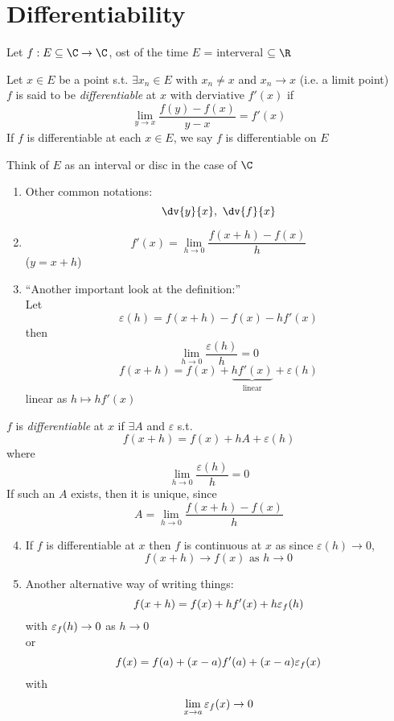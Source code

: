 \section{Differentiability}
\begin{normal}
Let $f:E\subseteq \C \to \C$, ost of the time $E$ = interveral $\subseteq \R$
\end{normal}
\begin{definition}
Let $x\in E$ be a point s.t. $\exists x_n \in E$ with $x_n \neq x$ and $x_n \to x$ (i.e. a limit point)\\
$f$ is said to be \emph{differentiable} at $x$ with derviative $f'(x)$ if
\[\lim_{y\to x} \frac{f(y)-f(x)}{y-x} = f'(x)\]
If $f$ is differentiable at each $x\in E$, we say $f$ is differentiable on $E$\\
\begin{note}
Think of $E$ as an interval or disc in the case of $\C$
\end{note}
\end{definition}
\begin{remark}
\hfill{ }
\begin{enumerate}
    \item Other common notations:
    \[\dv{y}{x}, \ \dv{f}{x}\]
    \item \[f'(x) = \lim_{h\to 0}\frac{f(x+h) - f(x)}{h}\]
    ($y=x+h$)
    \item ``Another important look at the definition:''\\
    Let
    \[\varepsilon(h) = f(x+h) - f(x) - hf'(x)\]
    then
    \[\lim_{h\to 0}\frac{\varepsilon(h)}{h} = 0\]
    \[f(x+h) = f(x) +\underbrace{ hf'(x)}_{\text{linear}} + \varepsilon(h)\]
    linear as $h\mapsto hf'(x)$
\end{enumerate}
\end{remark}
\begin{definition}[alternative]
$f$ is \emph{differentiable} at $x$ if $\exists A$ and $\varepsilon$ s.t.
\[f(x+h) = f(x) + hA + \varepsilon(h)\]
where
\[\lim_{h\to 0} \frac{\varepsilon(h)}{h} = 0\]
If such an $A$ exists, then it is unique, since
\[A = \lim_{h\to 0} \frac{f(x+h)-f(x)}{h}\]
\end{definition}
\begin{remark}
\hfill{ }
\begin{enumerate}
\setcounter{enumi}{3}
    \item If $f$ is differentiable at $x$ then $f$ is continuous at $x$ as since $\varepsilon(h) \to 0$,
    \[f(x+h) \to f(x) \text{ as }h\to 0\]
    \item Another alternative way of writing things:
    \[f(x+h) = f(x) + hf'(x) + h\varepsilon_f(h)\]
    with $\varepsilon_f(h) \to 0$ as $h\to 0$\\
    or
    \[f(x) = f(a) + (x-a)f'(a) + (x-a)\varepsilon_f(x)\]
    with
    \[\lim_{x\to a} \varepsilon_f(x) \to 0\]
\end{enumerate}
\end{remark}
